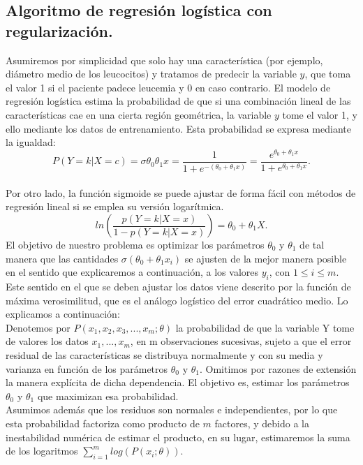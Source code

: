 \documentclass[a4paper,11pt]{article}
\begin{document}
\subsection{Algoritmo de regresión logística con regularización.}

Asumiremos por simplicidad que solo hay una característica (por ejemplo,
diámetro medio de los leucocitos) y tratamos de predecir la variable $y$, que
toma el valor 1 si el paciente padece leucemia y 0 en caso contrario. El modelo
de regresión logística estima la probabilidad de que si una combinación lineal de
las características cae en una cierta región geométrica, la variable $y$ tome el
valor 1, y ello mediante los datos de entrenamiento. Esta probabilidad se expresa
mediante la igualdad:
\[
P(Y=k|X=c)=\sigma\theta_0\theta_1 x=\frac{1}{1+e^{-(\theta_0+\theta_1 x)}}=\frac{e^{\theta_0+\theta_1 x}}{1+e^{\theta_0+\theta_1 x}}.
\]
\\
Por otro lado, la función sigmoide se puede ajustar de forma fácil con
métodos de regresión lineal si se emplea su versión logarítmica.
\[
ln\left( \frac{p(Y=k|X=x)}{1-p(Y=k|X=x)}\right)=\theta_0 + \theta_1 X .
\]
El objetivo de nuestro problema es optimizar los parámetros $\theta_0$ y $\theta_1$ de tal
manera que las cantidades $\sigma (\theta_0 + \theta_1 x_{i})$ se ajusten de la mejor manera posible en el sentido que explicaremos a continuación, a los valores $y_i$, con $1 \leq i \leq m$.
Este sentido en el que se deben ajustar los datos viene descrito por la función de
máxima verosimilitud, que es el análogo logístico del error cuadrático medio. Lo explicamos a continuación:\\

\noindent
Denotemos por $P(x_1, x_2, x_3, ..., x_m; \theta)$ la probabilidad de que la variable Y tome
de valores los datos $x_1, ..., x_m$, en m observaciones sucesivas, sujeto a que el error
residual de las características se distribuya normalmente y con su media y varianza en función de los parámetros $\theta_0$ y $\theta_1$. Omitimos por razones de extensión la
manera explícita de dicha dependencia. El objetivo es, estimar
los parámetros $\theta_0$ y $\theta_1$ que maximizan esa probabilidad.\\

\noindent
Asumimos además que los residuos son normales e independientes, por lo que esta probabilidad factoriza como producto de $m$ factores, y debido a la inestabilidad
numérica de estimar el producto, en su lugar, estimaremos la suma de los logaritmos $\sum_{i=1}^m log(P(x_i ;\theta))$.\\
\end{document}
